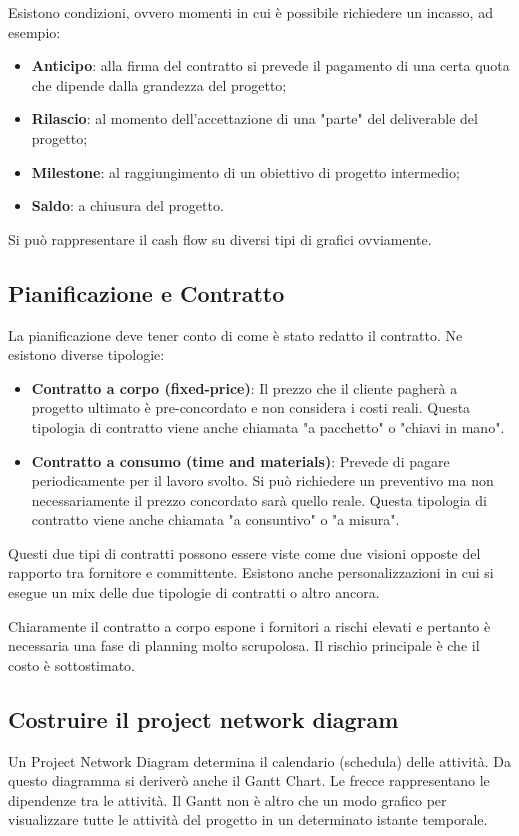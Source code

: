 \noindent Esistono condizioni, ovvero momenti in cui è possibile richiedere un incasso, ad esempio:
\begin{itemize}
	\item \textbf{Anticipo}: alla firma del contratto si prevede il pagamento di una certa quota che dipende dalla grandezza del progetto;
	\item \textbf{Rilascio}: al momento dell'accettazione di una "parte" del deliverable del progetto;
	\item \textbf{Milestone}: al raggiungimento di un obiettivo di progetto intermedio;
	\item \textbf{Saldo}: a chiusura del progetto.
\end{itemize}
Si può rappresentare il cash flow su diversi tipi di grafici ovviamente.
\subsection{Pianificazione e Contratto}
La pianificazione deve tener conto di come è stato redatto il contratto. Ne esistono diverse tipologie:
\begin{itemize}
	\item \textbf{Contratto a corpo (fixed-price)}: Il prezzo che il cliente pagherà a progetto ultimato è pre-concordato e non considera i costi reali. Questa tipologia di contratto viene anche chiamata "a pacchetto" o "chiavi in mano".
	\item \textbf{Contratto a consumo (time and materials)}: Prevede di pagare periodicamente per il lavoro svolto. Si può richiedere un preventivo ma non necessariamente il prezzo concordato sarà quello reale. Questa tipologia di contratto viene anche chiamata "a consuntivo" o "a misura".
\end{itemize}
Questi due tipi di contratti possono essere viste come due visioni opposte del rapporto tra fornitore e committente. Esistono anche personalizzazioni in cui si esegue un mix delle due tipologie di contratti o altro ancora.

\noindent Chiaramente il contratto a corpo espone i fornitori a rischi elevati e pertanto è necessaria una fase di planning molto scrupolosa. Il rischio principale è che il costo è sottostimato.
\subsection{Costruire il project network diagram}
Un Project Network Diagram determina il calendario (schedula) delle attività. Da questo diagramma si deriverò anche il Gantt Chart. Le frecce rappresentano le dipendenze tra le attività. Il Gantt non è altro che un modo grafico per visualizzare tutte le attività del progetto in un determinato istante temporale.
